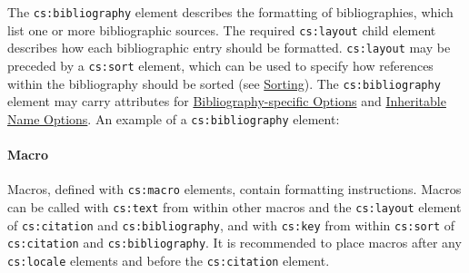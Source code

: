 The \texttt{cs:bibliography} element describes the formatting of
bibliographies, which list one or more bibliographic sources. The
required \texttt{cs:layout} child element describes how each
bibliographic entry should be formatted. \texttt{cs:layout} may be
preceded by a \texttt{cs:sort} element, which can be used to specify how
references within the bibliography should be sorted (see
\protect\hyperlink{sorting}{Sorting}). The \texttt{cs:bibliography}
element may carry attributes for
\protect\hyperlink{bibliography-specific-options}{Bibliography-specific
Options} and \protect\hyperlink{inheritable-name-options}{Inheritable
Name Options}. An example of a \texttt{cs:bibliography} element:

\begin{Shaded}
\begin{Highlighting}[]
\NormalTok{\textless{}}\NormalTok{\textgreater{}}
\NormalTok{  \textless{}}\NormalTok{\textgreater{}}
\NormalTok{    \textless{}}\NormalTok{/\textgreater{}}
\NormalTok{  \textless{}/}\NormalTok{\textgreater{}}
\NormalTok{  \textless{}}\NormalTok{\textgreater{}}
\NormalTok{    \textless{}}\NormalTok{\textgreater{}}
\NormalTok{      \textless{}}\NormalTok{/\textgreater{}}
\NormalTok{      \textless{}}\NormalTok{/\textgreater{}}
\NormalTok{    \textless{}/}\NormalTok{\textgreater{}}
\NormalTok{  \textless{}/}\NormalTok{\textgreater{}}
\NormalTok{\textless{}/}\NormalTok{\textgreater{}}
\end{Highlighting}
\end{Shaded}

\hypertarget{macro}{%
\paragraph{Macro}\label{macro}}

Macros, defined with \texttt{cs:macro} elements, contain formatting
instructions. Macros can be called with \texttt{cs:text} from within
other macros and the \texttt{cs:layout} element of \texttt{cs:citation}
and \texttt{cs:bibliography}, and with \texttt{cs:key} from within
\texttt{cs:sort} of \texttt{cs:citation} and \texttt{cs:bibliography}.
It is recommended to place macros after any \texttt{cs:locale} elements
and before the \texttt{cs:citation} element.

